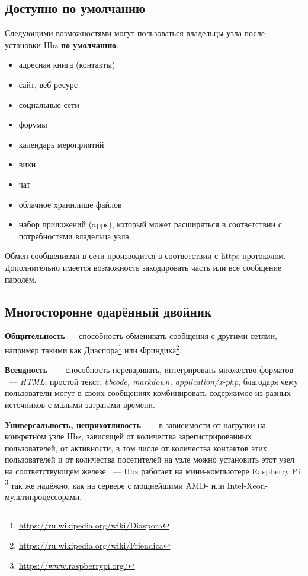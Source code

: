 \documentclass[10pt, a5paper]{article}
\begin{document}
\subsection*{Доступно по умолчанию}

Следующими возможностями могут пользоваться владельцы узла после установки Hbz \textbf{по умолчанию}:

\begin{itemize}
  \item адресная книга (контакты)
  \item сайт, веб-ресурс
  \item социальные сети
  \item форумы
  \item календарь мероприятий
  \item вики
  \item чат
  \item облачное хранилище файлов
  \item набор приложений (apps), который может расширяться в соответствии с потребностями владельца узла.
\end{itemize}

Обмен сообщениями в сети производится в соответствии с https-протоколом. Дополнительно имеется возможность закодировать часть или всё сообщение паролем.

\subsection*{Многосторонне одарённый двойник}

\textbf{Общительность} --- способность обменивать сообщения с другими сетями, например такими как Диаспора\footnote{\url{https://ru.wikipedia.org/wiki/Diaspora}} или Фриндика\footnote{\url{https://ru.wikipedia.org/wiki/Friendica}}.

\textbf{Всеядность} ~--- способность переваривать, интегрировать множество форматов ~--- \emph{HTML}, простой текст, \emph{bbcode, markdown, application/x-php}, благодаря чему пользователи могут в своих сообщениях комбинировать содержимое из разных источников с малыми затратами времени.

\textbf{Универсальность, неприхотливость} ~--- в зависимости от нагрузки на конкретном узле Hbz, зависящей от количества зарегистрированных пользователей, от активности, в том числе от количества контактов этих пользователей и от количества посетителей на узле можно установить этот узел на соответствующем железе ~--- Hbz работает на мини-компьютере Raspberry Pi \footnote{\url{https://www.raspberrypi.org/}} так же надёжно, как на сервере с мощнейшими AMD- или Intel-Xeon- мультипроцессорами.
\end{document}
